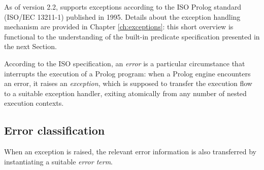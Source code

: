 As of version 2.2, \tuprolog{} supports exceptions according to the ISO Prolog standard (ISO/IEC 13211-1) published in 1995.
%
Details about the exception handling mechanism are provided in Chapter \ref{ch:exceptions}: this short overview is functional to the understanding of the built-in predicate specification presented in the next Section.

According to the ISO specification, an \textit{error} is a particular circumstance that interrupts the execution of a Prolog program: when a Prolog engine encounters an error, it raises an \textit{exception}, which is supposed to transfer the execution flow to a suitable exception handler, exiting atomically from any number of nested execution contexts.

\subsection{Error classification}
\label{ssec:error classification}
When an exception is raised, the relevant error information is also transferred by instantiating a suitable \textit{error term}.

